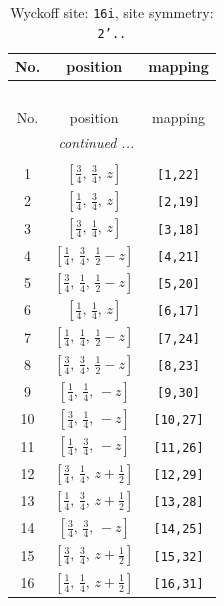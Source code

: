 \documentclass[fleqn,8pt]{jsarticle}
\begin{document}
\begin{longtable}{ccc}
\caption{Wyckoff site: {\tt 16i}, site symmetry: {\tt 2'..}}
 \\
 \hline \hline
No. & position & mapping \\ \hline \endfirsthead

\multicolumn{2}{l}{\tablename\ \thetable{}} \\
 \hline \hline
No. & position & mapping \\ \hline \endhead

 \hline \hline
\multicolumn{2}{r}{\footnotesize\it continued ...} \\ \endfoot

 \hline \hline
\multicolumn{2}{r}{} \\ \endlastfoot

1 & $\left[ \frac{3}{4},\, \frac{3}{4},\, z \right]$ & {\tt [1,22]} \\ \hline
2 & $\left[ \frac{1}{4},\, \frac{3}{4},\, z \right]$ & {\tt [2,19]} \\ \hline
3 & $\left[ \frac{3}{4},\, \frac{1}{4},\, z \right]$ & {\tt [3,18]} \\ \hline
4 & $\left[ \frac{1}{4},\, \frac{3}{4},\, \frac{1}{2} - z \right]$ & {\tt [4,21]} \\ \hline
5 & $\left[ \frac{3}{4},\, \frac{1}{4},\, \frac{1}{2} - z \right]$ & {\tt [5,20]} \\ \hline
6 & $\left[ \frac{1}{4},\, \frac{1}{4},\, z \right]$ & {\tt [6,17]} \\ \hline
7 & $\left[ \frac{1}{4},\, \frac{1}{4},\, \frac{1}{2} - z \right]$ & {\tt [7,24]} \\ \hline
8 & $\left[ \frac{3}{4},\, \frac{3}{4},\, \frac{1}{2} - z \right]$ & {\tt [8,23]} \\ \hline
9 & $\left[ \frac{1}{4},\, \frac{1}{4},\, - z \right]$ & {\tt [9,30]} \\ \hline
10 & $\left[ \frac{3}{4},\, \frac{1}{4},\, - z \right]$ & {\tt [10,27]} \\ \hline
11 & $\left[ \frac{1}{4},\, \frac{3}{4},\, - z \right]$ & {\tt [11,26]} \\ \hline
12 & $\left[ \frac{3}{4},\, \frac{1}{4},\, z + \frac{1}{2} \right]$ & {\tt [12,29]} \\ \hline
13 & $\left[ \frac{1}{4},\, \frac{3}{4},\, z + \frac{1}{2} \right]$ & {\tt [13,28]} \\ \hline
14 & $\left[ \frac{3}{4},\, \frac{3}{4},\, - z \right]$ & {\tt [14,25]} \\ \hline
15 & $\left[ \frac{3}{4},\, \frac{3}{4},\, z + \frac{1}{2} \right]$ & {\tt [15,32]} \\ \hline
16 & $\left[ \frac{1}{4},\, \frac{1}{4},\, z + \frac{1}{2} \right]$ & {\tt [16,31]} \\
\end{longtable}
\end{document}
